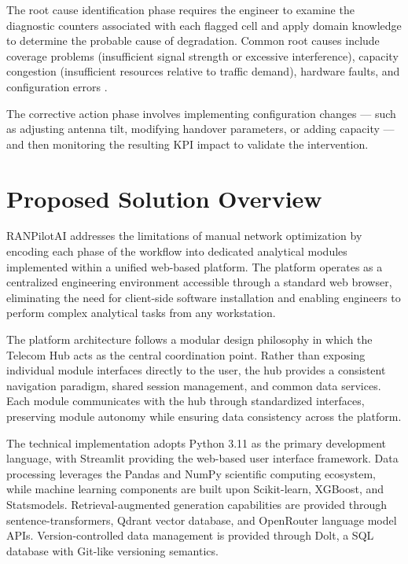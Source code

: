 The root cause identification phase requires the engineer to examine the diagnostic counters associated with each flagged cell and apply domain knowledge to determine the probable cause of degradation. Common root causes include coverage problems (insufficient signal strength or excessive interference), capacity congestion (insufficient resources relative to traffic demand), hardware faults, and configuration errors \cite{holma2011}.

The corrective action phase involves implementing configuration changes — such as adjusting antenna tilt, modifying handover parameters, or adding capacity — and then monitoring the resulting KPI impact to validate the intervention.

\section{Proposed Solution Overview}

RANPilotAI addresses the limitations of manual network optimization by encoding each phase of the workflow into dedicated analytical modules implemented within a unified web-based platform. The platform operates as a centralized engineering environment accessible through a standard web browser, eliminating the need for client-side software installation and enabling engineers to perform complex analytical tasks from any workstation.

The platform architecture follows a modular design philosophy in which the Telecom Hub acts as the central coordination point. Rather than exposing individual module interfaces directly to the user, the hub provides a consistent navigation paradigm, shared session management, and common data services. Each module communicates with the hub through standardized interfaces, preserving module autonomy while ensuring data consistency across the platform.

The technical implementation adopts Python 3.11 as the primary development language, with Streamlit providing the web-based user interface framework. Data processing leverages the Pandas and NumPy scientific computing ecosystem, while machine learning components are built upon Scikit-learn, XGBoost, and Statsmodels. Retrieval-augmented generation capabilities are provided through sentence-transformers, Qdrant vector database, and OpenRouter language model APIs. Version-controlled data management is provided through Dolt, a SQL database with Git-like versioning semantics.

